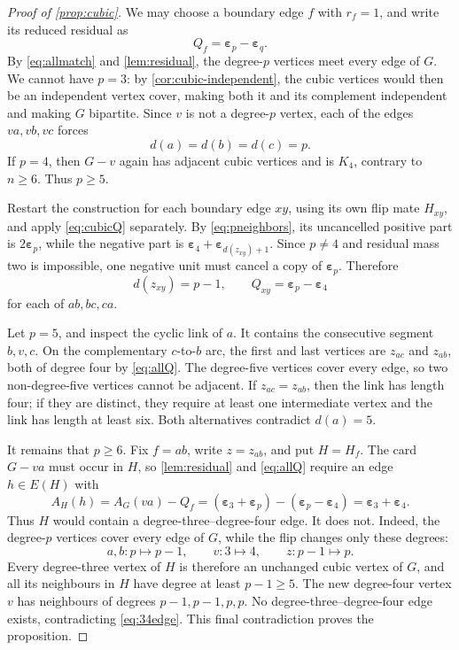 \documentclass[10pt,a4paper]{amsart}
\newcommand{\eps}{\boldsymbol\varepsilon}
\begin{document}
\begin{proof}[Proof of \cref{prop:cubic}]
We may choose a boundary edge \(f\) with \(r_f=1\), and write its reduced
residual as
\[
                         Q_f=\eps_p-\eps_q.          \tag{E.3}\label{eq:massone}
\]
By \eqref{eq:allmatch} and \cref{lem:residual}, the degree-\(p\) vertices
meet every edge of \(G\).  We cannot have \(p=3\): by
\cref{cor:cubic-independent}, the cubic vertices would then be an independent
vertex cover, making both it and its complement independent and making
\(G\) bipartite.  Since \(v\) is not a degree-\(p\) vertex, each of the
edges \(va,vb,vc\) forces
\[
                         d(a)=d(b)=d(c)=p.           \tag{E.4}\label{eq:pneighbors}
\]
If \(p=4\), then \(G-v\) again has adjacent cubic vertices and is \(K_4\),
contrary to \(n\ge6\).  Thus \(p\ge5\).

Restart the construction for each boundary edge \(xy\), using its own flip
mate \(H_{xy}\), and apply \eqref{eq:cubicQ} separately.  By
\eqref{eq:pneighbors}, its uncancelled positive part is \(2\eps_p\), while
the negative part is \(\eps_4+\eps_{d(z_{xy})+1}\).  Since \(p\ne4\) and
residual mass two is impossible, one negative unit must cancel a copy of
\(\eps_p\).  Therefore
\[
       d(z_{xy})=p-1,
       \qquad Q_{xy}=\eps_p-\eps_4                  \tag{E.5}\label{eq:allQ}
\]
for each of \(ab,bc,ca\).

Let \(p=5\), and inspect the cyclic link of \(a\).  It contains the
consecutive segment \(b,v,c\).  On the complementary \(c\)-to-\(b\) arc,
the first and last vertices are \(z_{ac}\) and \(z_{ab}\), both of degree
four by \eqref{eq:allQ}.  The degree-five vertices cover every edge, so two
non-degree-five vertices cannot be adjacent.  If
\(z_{ac}=z_{ab}\), then the link has length four; if they are distinct,
they require at least one intermediate vertex and the link has length at
least six.  Both alternatives contradict \(d(a)=5\).

It remains that \(p\ge6\).  Fix \(f=ab\), write \(z=z_{ab}\), and put
\(H=H_f\).  The card \(G-va\) must occur in \(H\), so
\cref{lem:residual} and \eqref{eq:allQ} require an edge \(h\in E(H)\) with
\[
  A_H(h)=A_G(va)-Q_f
        =(\eps_3+\eps_p)-(\eps_p-\eps_4)
        =\eps_3+\eps_4.                              \tag{E.6}\label{eq:34edge}
\]
Thus \(H\) would contain a degree-three--degree-four edge.  It does not.
Indeed, the degree-\(p\) vertices cover every edge of \(G\), while the flip
changes only these degrees:
\[
  a,b:p\mapsto p-1,\qquad v:3\mapsto4,
  \qquad z:p-1\mapsto p.
\]
Every degree-three vertex of \(H\) is therefore an unchanged cubic vertex of
\(G\), and all its neighbours in \(H\) have degree at least
\(p-1\ge5\).  The new degree-four vertex \(v\) has neighbours of degrees
\(p-1,p-1,p,p\).  No degree-three--degree-four edge exists, contradicting
\eqref{eq:34edge}.  This final contradiction proves the proposition.
\end{proof}
\end{document}

